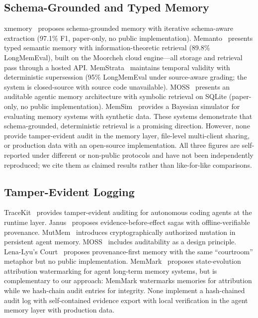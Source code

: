 \documentclass{article}
\begin{document}
\subsection{Schema-Grounded and Typed Memory}
xmemory~\citep{xmemory} proposes schema-grounded memory with iterative schema-aware extraction (97.1\% F1, paper-only, no public implementation). Memanto~\citep{memanto} presents typed semantic memory with information-theoretic retrieval (89.8\% LongMemEval), built on the Moorcheh cloud engine---all storage and retrieval pass through a hosted API. MemStrata~\citep{memstrata} maintains temporal validity with deterministic supersession (95\% LongMemEval under source-aware grading; the system is closed-source with source code unavailable). MOSS~\citep{moss} presents an auditable agentic memory architecture with symbolic retrieval on SQLite (paper-only, no public implementation). MemSim~\citep{memsim} provides a Bayesian simulator for evaluating memory systems with synthetic data. These systems demonstrate that schema-grounded, deterministic retrieval is a promising direction. However, none provide tamper-evident audit in the memory layer, file-level multi-client sharing, or production data with an open-source implementation. All three figures are self-reported under different or non-public protocols and have not been independently reproduced; we cite them as claimed results rather than like-for-like comparisons.

\subsection{Tamper-Evident Logging}
TraceKit~\citep{tracekit} provides tamper-evident auditing for autonomous coding agents at the runtime layer. Janus~\citep{janus} proposes evidence-before-effect sagas with offline-verifiable provenance. MutMem~\citep{mutmem} introduces cryptographically authorized mutation in persistent agent memory. MOSS~\citep{moss} includes auditability as a design principle. Lena-Lyu's Court~\citep{court} proposes provenance-first memory with the same ``courtroom'' metaphor but no public implementation. MemMark~\citep{memmark} proposes state-evolution attribution watermarking for agent long-term memory systems, but is complementary to our approach: MemMark watermarks memories for attribution while we hash-chain audit entries for integrity. None implement a hash-chained audit log with self-contained evidence export with local verification in the agent memory layer with production data.
\end{document}
